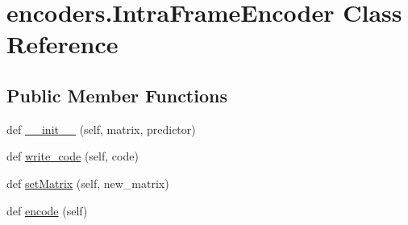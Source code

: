 \hypertarget{classencoders_1_1IntraFrameEncoder}{}\section{encoders.\+Intra\+Frame\+Encoder Class Reference}
\label{classencoders_1_1IntraFrameEncoder}
\subsection*{Public Member Functions}
\begin{DoxyCompactItemize}
\item 
def \hyperlink{classencoders_1_1IntraFrameEncoder_abdd616416c053aad5a2879ac2c64b7c6}{\+\_\+\+\_\+init\+\_\+\+\_\+} (self, matrix, predictor)
\item 
def \hyperlink{classencoders_1_1IntraFrameEncoder_a227ed9ea286d56d7f3e5ddb8ad516a3f}{write\+\_\+code} (self, code)
\item 
def \hyperlink{classencoders_1_1IntraFrameEncoder_afd51a089d10686691e32b453880c3e17}{set\+Matrix} (self, new\+\_\+matrix)
\item 
def \hyperlink{classencoders_1_1IntraFrameEncoder_ab8f41032eb1b0db6f300721c49924c7b}{encode} (self)
\end{DoxyCompactItemize}
